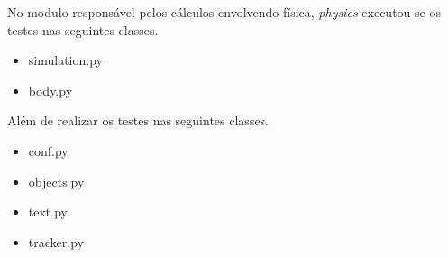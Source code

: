 No modulo responsável pelos cálculos envolvendo física, \textit{physics} executou-se os testes nas seguintes classes. 
\begin{itemize}
\item simulation.py
\item body.py
\end{itemize}

Além de realizar os testes nas seguintes classes.
\begin{itemize}
\item conf.py
\item objects.py
\item text.py
\item tracker.py
\end{itemize}
